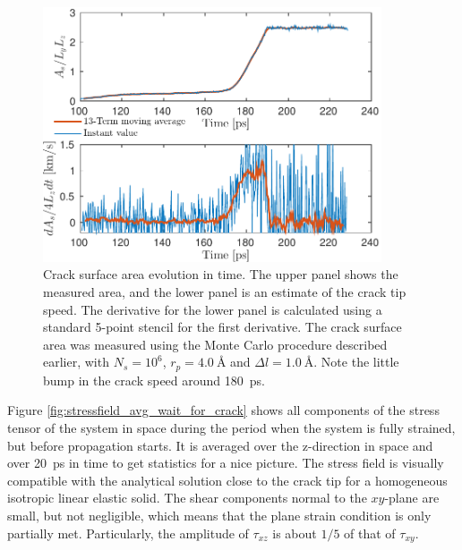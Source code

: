 \begin{figure}
\centering
\includegraphics[width=10cm]{../figures/thesis/crack_area_evolution_1048.pdf}
\caption{Crack surface area evolution in time. The upper panel shows the measured area, and the lower panel is an estimate of the crack tip speed. The derivative for the lower panel is calculated using a standard 5-point stencil for the first derivative. The crack surface area was measured using the Monte Carlo procedure described earlier, with $N_s = 10^6$, $r_p = \SI{4.0}{\angstrom}$ and $\Delta l = \SI{1.0}{\angstrom}$. Note the little bump in the crack speed around \SI{180}{\pico\second}.}
\label{fig:crack_area_evolution_1048}
\end{figure}

Figure \ref{fig:stressfield_avg_wait_for_crack} shows all components of the stress tensor of the system in space during the period when the system is fully strained, but before propagation starts. It is averaged over the z-direction in space and over \SI{20}{\pico\second} in time to get statistics for a nice picture. The stress field is visually compatible with the analytical solution close to the crack tip for a homogeneous isotropic linear elastic solid. The shear components normal to the $xy$-plane are small, but not negligible, which means that the plane strain condition is only partially met. Particularly, the amplitude of $\tau_{xz}$ is about $1/5$ of that of $\tau_{xy}$. 


